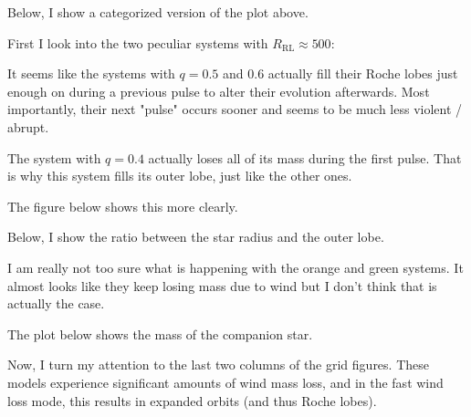 \documentclass[a4paper,10pt]{article}
\begin{document}
Below, I show a categorized version of the plot above.

\begin{figure}[ht]
    \centering
\end{figure}

First I look into the two peculiar systems with \(R_\text{RL} \approx 500\):
\begin{figure}[ht]
    \centering
\end{figure}

It seems like the systems with \(q=0.5\) and \(0.6\) actually fill their Roche lobes just enough on during a previous pulse to alter their evolution afterwards. Most importantly, their next "pulse" occurs sooner and seems to be much less violent / abrupt.

The system with \(q=0.4\) actually loses all of its mass during the first pulse. That is why this system fills its outer lobe, just like the other ones.
\nextpage

The figure below shows this more clearly.
\begin{figure}[ht]
    \centering
\end{figure}

Below, I show the ratio between the star radius and the outer lobe.
\begin{figure}[ht]
    \centering
\end{figure}

I am really not too sure what is happening with the orange and green systems. It almost looks like they keep losing mass due to wind but I don't think that is actually the case.

The plot below shows the mass of the companion star.

\begin{figure}[ht]
    \centering
\end{figure}

\nextpage

Now, I turn my attention to the last two columns of the grid figures. These models experience significant amounts of wind mass loss, and in the fast wind loss mode, this results in expanded orbits (and thus Roche lobes).
\end{document}
